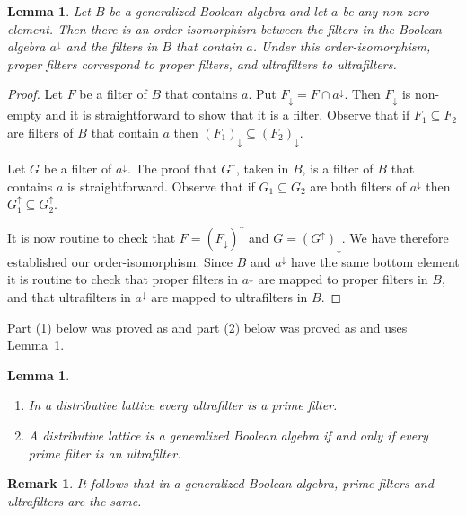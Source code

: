 \documentclass[a4paper]{amsart}
\newtheorem{lemma}[theorem]{Lemma}
\newtheorem{remark}[theorem]{Remark}
\begin{document}
\begin{lemma}\label{lem:bijection} Let $B$ be a generalized Boolean algebra and let $a$ be any non-zero element.
Then there is an order-isomorphism between the filters in the Boolean algebra $a^{\downarrow}$ and 
the filters in $B$ that contain $a$.
Under this order-isomorphism, proper filters correspond to proper filters,
and ultrafilters to ultrafilters.
\end{lemma}
\begin{proof} Let $F$ be a filter of $B$ that contains $a$.
Put $F_{\downarrow} = F \cap a^{\downarrow}$.
Then $F_{\downarrow}$ is non-empty and it is straightforward to show that it is a filter.
Observe that if $F_{1} \subseteq F_{2}$ are filters of $B$ that contain $a$
then $(F_{1})_{\downarrow} \subseteq (F_{2})_{\downarrow}$.

Let $G$ be a filter of $a^{\downarrow}$.
The proof that $G^{\uparrow}$, taken in $B$, is a filter of $B$ that contains $a$ is straightforward.
Observe that if $G_{1} \subseteq G_{2}$ are both filters of $a^{\downarrow}$
then $G_{1}^{\uparrow} \subseteq G_{2}^{\uparrow}$.

It is now routine to check that
$F = (F_{\downarrow})^{\uparrow}$ and $G = (G^{\uparrow})_{\downarrow}$.
We have therefore established our order-isomorphism.
Since $B$ and $a^{\downarrow}$ have the same bottom element
it is routine to check that proper filters in $a^{\downarrow}$ are mapped
to proper filters in $B$,
and that ultrafilters in $a^{\downarrow}$ are mapped to ultrafilters in $B$.
\end{proof}

Part (1) below was proved as \cite[Theorem 3]{Stone1937b}
and 
part (2) below was proved as \cite[Proposition 1.6]{LL} and uses Lemma~\ref{lem:bijection}.

\begin{lemma}\label{lem:ll} \mbox{}
\begin{enumerate}
\item In a distributive lattice every ultrafilter is a prime filter.
\item A distributive lattice is a generalized Boolean algebra if and only if every prime filter is an ultrafilter.
\end{enumerate}
\end{lemma}


\begin{remark}\label{rem:prime-equal-uf}
{\em 
It follows that in a generalized Boolean algebra, prime filters and ultrafilters are the same.
}
\end{remark}
\end{document}
